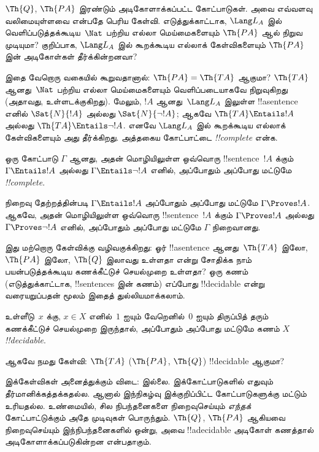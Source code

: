 \documentclass[../../../include/open-logic-section]{subfiles}
\begin{document}
$\Th{Q}$, $\Th{PA}$ இரண்டும் அடிகோளாக்கப்பட்ட கோட்பாடுகள். அவை எவ்வளவு
வலிமையுள்ளவை என்பதே பெரிய கேள்வி. எடுத்துக்காட்டாக, $\Lang L_A$ இல்
வெளிப்படுத்தக்கூடிய~$\Nat$ பற்றிய எல்லா மெய்மைகளையும் $\Th{PA}$ ஆல்
நிறுவ முடியுமா? குறிப்பாக, $\Lang L_A$ இல் கூறக்கூடிய எல்லாக் கேள்விகளையும்
$\Th{PA}$ இன் அடிகோள்கள் தீர்க்கின்றனவா?

இதை வேறொரு வகையில் கூறுவதானால்: $\Th{PA} = \Th{TA}$ ஆகுமா?
$\Th{TA}$ ஆனது~$\Nat$ பற்றிய எல்லா மெய்மைகளையும் வெளிப்படையாகவே
நிறுவுகிறது (அதாவது, உள்ளடக்குகிறது). மேலும், $!A$ ஆனது~$\Lang L_A$
இலுள்ள !!a{sentence} எனில் $\Sat{N}{!A}$ அல்லது $\Sat{N}{\lnot !A}$;
ஆகவே $\Th{TA} \Entails !A$ அல்லது $\Th{TA} \Entails \lnot !A$.
எனவே $\Lang L_A$ இல் கூறக்கூடிய எல்லாக் கேள்விகளையும் அது தீர்க்கிறது.
அத்தகைய கோட்பாட்டை \emph{!!{complete}} என்க.

\begin{defn}
ஒரு கோட்பாடு $\Gamma$ ஆனது, அதன் மொழியிலுள்ள ஒவ்வொரு
!!{sentence}~$!A$ க்கும் $\Gamma \Entails !A$ அல்லது $\Gamma \Entails
\lnot !A$ எனில், அப்போதும் அப்போது மட்டுமே \emph{!!{complete}}.
\end{defn}

\begin{explain}
நிறைவு தேற்றத்தின்படி $\Gamma \Entails !A$ அப்போதும் அப்போது மட்டுமே
$\Gamma \Proves !A$. ஆகவே, அதன் மொழியிலுள்ள ஒவ்வொரு
!!{sentence}~$!A$ க்கும் $\Gamma \Proves !A$ அல்லது $\Gamma \Proves
\lnot !A$ எனில், அப்போதும் அப்போது மட்டுமே $\Gamma$ நிறைவானது.
\end{explain}

இது மற்றொரு கேள்விக்கு வழிவகுக்கிறது: ஓர் !!a{sentence} ஆனது~$\Th{TA}$
இலோ, $\Th{PA}$ இலோ, $\Th{Q}$ இலாவது உள்ளதா என்று சோதிக்க நாம்
பயன்படுத்தக்கூடிய கணக்கீட்டுச் செயல்முறை உள்ளதா? ஒரு கணம் (எடுத்துக்காட்டாக,
!!{sentence}s இன் கணம்) எப்போது !!{decidable} என்று வரையறுப்பதன் மூலம்
இதைத் துல்லியமாக்கலாம்.

\begin{defn}
உள்ளீடு~$x$ க்கு, $x \in X$ எனில்~$1$ ஐயும் வேறெனில்~$0$ ஐயும் திருப்பித்
தரும் கணக்கீட்டுச் செயல்முறை இருந்தால், அப்போதும் அப்போது மட்டுமே கணம் $X$
\emph{!!{decidable}}.
\end{defn}

ஆகவே நமது கேள்வி: $\Th{TA}$ ($\Th{PA}$, $\Th{Q}$) !!{decidable} ஆகுமா?

இக்கேள்விகள் அனைத்துக்கும் விடை: இல்லை. இக்கோட்பாடுகளில் எதுவும்
தீர்மானிக்கத்தக்கதல்ல. ஆனால் இந்நிகழ்வு இக்குறிப்பிட்ட கோட்பாடுகளுக்கு மட்டும்
உரியதல்ல. உண்மையில், சில நிபந்தனைகளை நிறைவுசெய்யும் \emph{எந்தக்}
கோட்பாட்டுக்கும் அதே முடிவுகள் பொருந்தும். $\Th{Q}$, $\Th{PA}$ ஆகியவை
நிறைவுசெய்யும் இந்நிபந்தனைகளில் ஒன்று, அவை !!a{decidable} அடிகோள் கணத்தால்
அடிகோளாக்கப்படுகின்றன என்பதாகும்.
\end{document}
